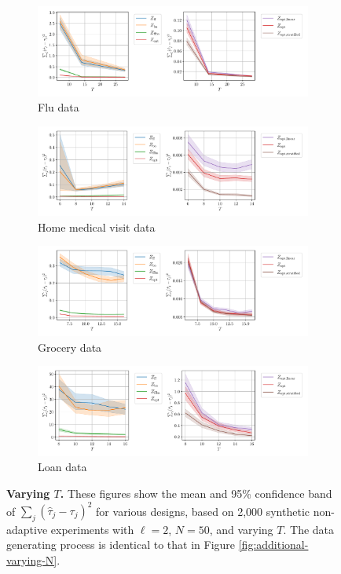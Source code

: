 \begin{figure}[H]
	\centering
	\begin{subfigure}{1\textwidth}
		\centering
		\includegraphics[width=0.75\linewidth]{plots/empirical/flu/nonadaptive/flu_N_50_varying_T_lag_2_agg.pdf}
		\caption{Flu data}
	\end{subfigure}
	\begin{subfigure}{1\textwidth}
		\centering
		\includegraphics[width=0.75\linewidth]{plots/empirical/medical/medical_N_50_varying_T_lag_2_agg.pdf}
		\caption{Home medical visit data}
	\end{subfigure}
	\begin{subfigure}{1\textwidth}
		\centering
		\includegraphics[width=0.75\linewidth]{plots/empirical/grocery/grocery_N_50_varying_T_lag_2_agg.pdf}
		\caption{Grocery data}
	\end{subfigure}
	\begin{subfigure}{1\textwidth}
		\centering
		\includegraphics[width=0.75\linewidth]{plots/empirical/loan/loan_N_50_varying_T_lag_2_agg.pdf}
		\caption{Loan data}
	\end{subfigure}
	\caption{\textbf{Varying $T$.} These figures show the mean and 95\% confidence band of $\sum_{j}(\hat{\tau}_j - \tau_j)^2$ for various designs, based on 2,000 synthetic non-adaptive experiments with $\ell = 2$, $N = 50$, and varying $T$. The data generating process is identical to that in Figure \ref{fig:additional-varying-N}.}
	\label{fig:additional-varying-T}
\end{figure}
\clearpage

